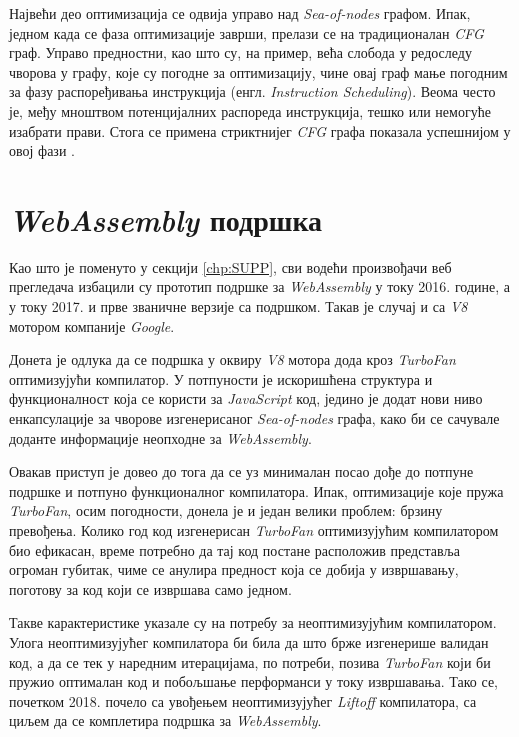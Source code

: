\documentclass[12pt,oneside]{memoir}
\begin{document}
Највећи део оптимизација се одвија управо над \textit{Sea-of-nodes} графом. Ипак, једном када се фаза оптимизације заврши, прелази се на традиционалан \textit{CFG} граф.
Управо предностни, као што су, на пример, већа слобода у редоследу чворова у графу, које су погодне за оптимизацију, чине овај граф мање погодним за фазу распоређивања
инструкција (енгл. \textit{Instruction Scheduling}). Веома често је, међу мноштвом потенцијалних распореда инструкција, тешко или немогуће изабрати прави. Стога се примена стриктнијег \textit{CFG}
графа показала успешнијом у овој фази \cite{TFJIT}.

\section{\textit{WebAssembly} подршка} \label{chp:V8WASM}

Као што је поменуто у секцији \ref{chp:SUPP}, сви водећи произвођачи веб прегледача избацили су прототип подршке за \textit{WebAssembly} у току 2016. године, а у току 2017.
и прве званичне верзије са подршком. Такав је случај и са \textit{V8} мотором компаније \textit{Google}.

Донета је одлука да се подршка у оквиру \textit{V8} мотора дода кроз \textit{TurboFan} оптимизујући компилатор. У потпуности је искоришћена структура и функционалност која се користи
за \textit{JavaScript} код, једино је додат нови ниво енкапсулације за чворове изгенерисаног \textit{Sea-of-nodes} графа, како би се сачувале доданте информације неопходне за
\textit{WebAssembly}.

Овакав приступ је довео до тога да се уз минималан посао дође до потпуне подршке и потпуно функционалног компилатора. Ипак, оптимизације које пружа \textit{TurboFan}, осим погодности,
донела је и један велики проблем: брзину превођења. Колико год код изгенерисан \textit{TurboFan} оптимизујућим компилатором био ефикасан, време потребно да тај код
постане расположив представља огроман губитак, чиме се анулира предност која се добија у извршавању, поготову за код који се извршава само једном.

Такве карактеристике указале су на потребу за неоптимизујућим компилатором. Улога неоптимизујућег компилатора би била да што брже изгенерише валидан код,
а да се тек у наредним итерацијама, по потреби, позива \textit{TurboFan} који би пружио оптималан код и побољшање перформанси у току извршавања.
Тако се, почетком 2018. почело са увођењем неоптимизујућег \textit{Liftoff} компилатора, са циљем да се комплетира подршка за \textit{WebAssembly}.
\end{document}
